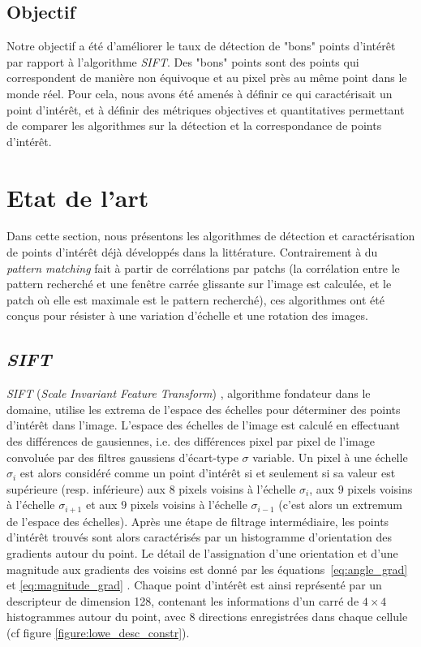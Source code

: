 \documentclass[
	a4paper, %
	10pt, %
	unnumberedsections, %
	twoside, %
]{LTJournalArticle}
\begin{document}
\subsection{Objectif}

Notre objectif a été d'améliorer le taux de détection de "bons" points d'intérêt par rapport à l'algorithme \textit{SIFT}. Des "bons" points sont des points qui correspondent de manière non équivoque et au pixel près au même point dans le monde réel.
Pour cela, nous avons été amenés à définir ce qui caractérisait un point d'intérêt, et à définir des métriques objectives et quantitatives permettant de comparer les algorithmes sur la détection et la correspondance de points d'intérêt.

\section{Etat de l'art}

Dans cette section, nous présentons les algorithmes de détection et caractérisation de points d'intérêt déjà développés dans la littérature.
Contrairement à du \textit{pattern matching} fait à partir de corrélations par patchs (la corrélation entre le pattern recherché et une fenêtre carrée glissante sur l'image est calculée, et le patch où elle est maximale est le pattern recherché), ces algorithmes ont été conçus pour résister à une variation d'échelle et une rotation des images.

\subsection{\textit{SIFT}}

\textit{SIFT} (\textit{Scale Invariant Feature Transform}) \autocite{Lowe:2004}, algorithme fondateur dans le domaine, utilise les extrema de l'espace des échelles pour déterminer des points d'intérêt dans l'image.
L'espace des échelles de l'image est calculé en effectuant des différences de gausiennes, i.e. des différences pixel par pixel de l'image convoluée par des filtres gaussiens d'écart-type $\sigma$ variable.
Un pixel à une échelle $\sigma_i$ est alors considéré comme un point d'intérêt si et seulement si sa valeur est supérieure (resp. inférieure) aux $8$ pixels voisins à l'échelle $\sigma_i$, aux $9$ pixels voisins à l'échelle $\sigma_{i+1}$ et aux $9$ pixels voisins à l'échelle $\sigma_{i-1}$ (c'est alors un extremum de l'espace des échelles).
Après une étape de filtrage intermédiaire, les points d'intérêt trouvés sont alors caractérisés par un histogramme d'orientation des gradients autour du point.
Le détail de l'assignation d'une orientation et d'une magnitude aux gradients des voisins est donné par les équations~\ref{eq:angle_grad} et \ref{eq:magnitude_grad} .
Chaque point d'intérêt est ainsi représenté par un descripteur de dimension 128, contenant les informations d'un carré de
$4 \times 4$ histogrammes autour du point, avec $8$ directions enregistrées dans chaque cellule (cf figure \ref{figure:lowe_desc_constr}).
\end{document}
